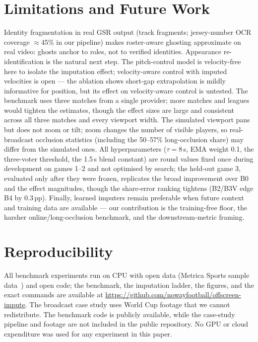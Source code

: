 \documentclass[11pt]{article}
\newcommand{\pp}{\,pp}   %
\begin{document}
\section{Limitations and Future Work}
\label{sec:limitations}

Identity fragmentation in real GSR output (track fragments; jersey-number OCR
coverage $\approx$45\% in our pipeline) makes roster-aware ghosting approximate
on real video: ghosts anchor to roles, not to verified identities. Appearance
re-identification is the natural next step. The pitch-control model is
velocity-free here to isolate the imputation effect; velocity-aware control with
imputed velocities is open --- the ablation shows short-gap extrapolation is
mildly informative for position, but its effect on velocity-aware control is
untested. The benchmark uses three matches from a single provider; more
matches and leagues would tighten the estimates, though the effect sizes are
large and consistent across all three matches and every viewport width. The simulated
viewport pans but does not zoom or tilt; zoom changes the number of visible
players, so real-broadcast occlusion statistics (including the 50--57\%
long-occlusion share) may differ from the simulated ones. All hyperparameters
($\tau = 8$\,s, EMA weight 0.1, the three-voter threshold, the 1.5\,s blend
constant) are round values fixed once during development on games 1--2 and not
optimised by search; the held-out game 3, evaluated only after they were
frozen, replicates the broad improvement over B0 and the effect magnitudes,
though the share-error ranking tightens (B2/B3V edge B4 by 0.3\pp{}). Finally,
learned imputers remain preferable when future context and training data are
available --- our contribution is the training-free floor, the harsher
online/long-occlusion benchmark, and the downstream-metric framing.

\section{Reproducibility}
\label{sec:repro}

All benchmark experiments run on CPU with open data (Metrica Sports sample
data~\citep{metrica2020}) and open code; the benchmark, the imputation ladder,
the figures, and the exact commands are available at
\url{https://github.com/nowayfootball/offscreen-impute}. The broadcast case
study uses World Cup footage that we cannot redistribute. The benchmark code is
publicly available, while the case-study pipeline and footage are not included
in the public repository. No GPU or cloud
expenditure was used for any experiment in this paper.



\end{document}
